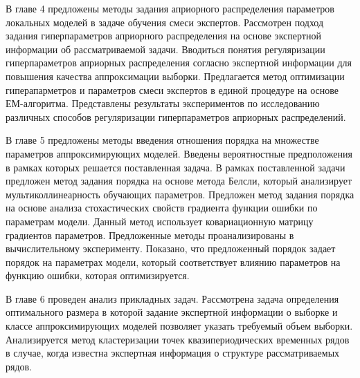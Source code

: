 В главе 4 предложены методы задания априорного распределения параметров локальных моделей в задаче обучения смеси экспертов. Рассмотрен подход задания гиперпараметров априорного распределения на основе экспертной информации об рассматриваемой задачи. Вводиться понятия регуляризации гиперпараметров априорных распределения согласно экспертной информации для повышения качества аппроксимации выборки. Предлагается метод оптимизации гиперапарметров и параметров смеси экспертов в единой процедуре на основе ЕМ-алгоритма. Представлены результаты экспериментов по исследованию различных способов регуляризации гиперпараметров априорных распределений.

В главе 5 предложены методы введения отношения порядка на множестве параметров аппроксимирующих моделей. Введены вероятностные предположения в рамках которых решается поставленная задача. В рамках поставленной задачи предложен метод задания порядка на основе метода Белсли, который анализирует мультиколлинеарность обучающих параметров. Предложен метод задания порядка на основе анализа стохастических свойств градиента функции ошибки по параметрам модели. Данный метод использует ковариационную матрицу градиентов параметров. Предложенные методы проанализированы в вычислительному эксперименту. Показано, что предложенный порядок задает порядок на параметрах модели, который соответствует влиянию параметров на функцию ошибки, которая оптимизируется.

В главе 6 проведен анализ прикладных задач. Рассмотрена задача определения оптимального размера в которой задание экспертной информации о выборке и классе аппроксимирующих моделей позволяет указать требуемый объем выборки. Анализируется метод кластеризации точек квазипериодических временных рядов в случае, когда известна экспертная информация о структуре рассматриваемых рядов.